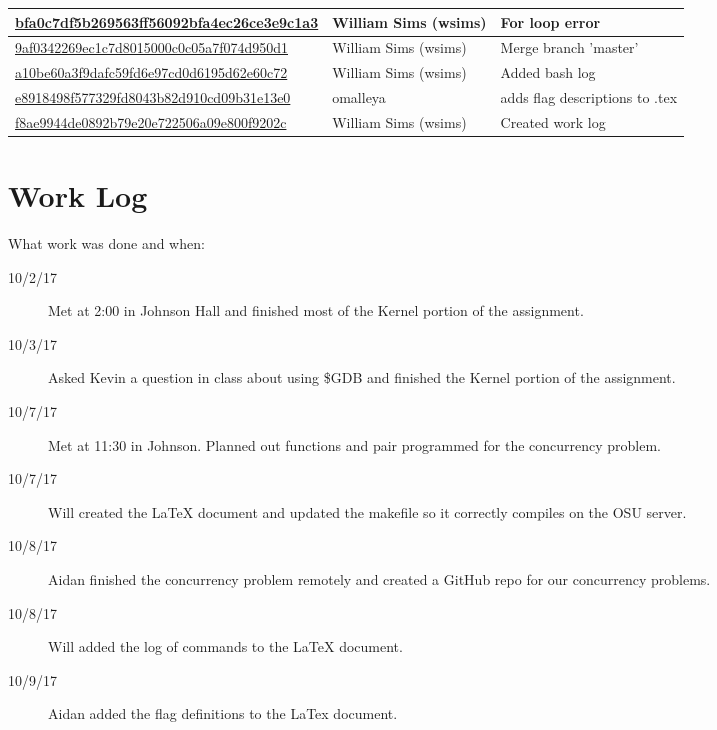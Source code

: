\documentclass[10pt,letterpaper,draftclsnofoot,onecolumn]{IEEEtran}
\begin{document}
\begin{center}
\begin{tabular}{ | p{8cm} | p{3cm} | p{6cm} |}
    \href{https://github.com/omalleya/cs444-concurrency-writeups/commit/bfa0c7df5b269563ff56092bfa4ec26ce3e9c1a3}{bfa0c7df5b269563ff56092bfa4ec26ce3e9c1a3} & William Sims (wsims) & For loop error \\ \hline
    \href{https://github.com/omalleya/cs444-concurrency-writeups/commit/9af0342269ec1c7d8015000c0c05a7f074d950d1}{9af0342269ec1c7d8015000c0c05a7f074d950d1} & William Sims (wsims) & Merge branch 'master' \\ \hline
    \href{https://github.com/omalleya/cs444-concurrency-writeups/commit/a10be60a3f9dafc59fd6e97cd0d6195d62e60c72}{a10be60a3f9dafc59fd6e97cd0d6195d62e60c72} & William Sims (wsims) & Added bash log \\ \hline
    \href{https://github.com/omalleya/cs444-concurrency-writeups/commit/e8918498f577329fd8043b82d910cd09b31e13e0}{e8918498f577329fd8043b82d910cd09b31e13e0} & omalleya & adds flag descriptions to .tex \\ \hline
    \href{https://github.com/omalleya/cs444-concurrency-writeups/commit/f8ae9944de0892b79e20e722506a09e800f9202c}{f8ae9944de0892b79e20e722506a09e800f9202c} & William Sims (wsims) & Created work log \\ \hline
    \end{tabular}
\end{center}

\section{Work Log}
\noindent What work was done and when:
\begin{description}
\item [10/2/17] Met at 2:00 in Johnson Hall and finished most of the Kernel portion of the assignment.
\item [10/3/17] Asked Kevin a question in class about using \$GDB and finished the Kernel portion of the assignment. 
\item [10/7/17] Met at 11:30 in Johnson. Planned out functions and pair programmed for the concurrency problem.
\item [10/7/17] Will created the LaTeX document and updated the makefile so it correctly compiles on the OSU server. 
\item [10/8/17] Aidan finished the concurrency problem remotely and created a GitHub repo for our concurrency problems. 
\item [10/8/17] Will added the log of commands to the LaTeX document. 
\item [10/9/17] Aidan added the flag definitions to the LaTex document. 
\end{description}
\end{document}
